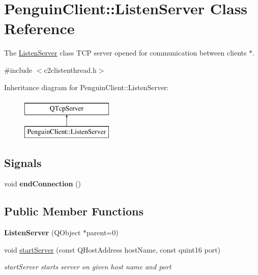 \hypertarget{classPenguinClient_1_1ListenServer}{\section{Penguin\-Client\-:\-:Listen\-Server Class Reference}
\label{classPenguinClient_1_1ListenServer}
}


The \hyperlink{classPenguinClient_1_1ListenServer}{Listen\-Server} class T\-C\-P server opened for communication between clients $\ast$.  




{\ttfamily \#include $<$c2clistenthread.\-h$>$}

Inheritance diagram for Penguin\-Client\-:\-:Listen\-Server\-:\begin{figure}[H]
\begin{center}
\leavevmode
\includegraphics[height=2.000000cm]{classPenguinClient_1_1ListenServer}
\end{center}
\end{figure}
\subsection*{Signals}
\begin{DoxyCompactItemize}
\item 
\hypertarget{classPenguinClient_1_1ListenServer_ab74d4758471671d645b2b735f1e26991}{void {\bfseries end\-Connection} ()}\label{classPenguinClient_1_1ListenServer_ab74d4758471671d645b2b735f1e26991}

\end{DoxyCompactItemize}
\subsection*{Public Member Functions}
\begin{DoxyCompactItemize}
\item 
\hypertarget{classPenguinClient_1_1ListenServer_adb2d8a57702edd4efba425d0f3032795}{{\bfseries Listen\-Server} (Q\-Object $\ast$parent=0)}\label{classPenguinClient_1_1ListenServer_adb2d8a57702edd4efba425d0f3032795}

\item 
void \hyperlink{classPenguinClient_1_1ListenServer_aa122118cd9b60c0a1caea453d3fc2bec}{start\-Server} (const Q\-Host\-Address host\-Name, const quint16 port)
\begin{DoxyCompactList}\small\item\em start\-Server starts server on given host name and port \end{DoxyCompactList}\end{DoxyCompactItemize}
